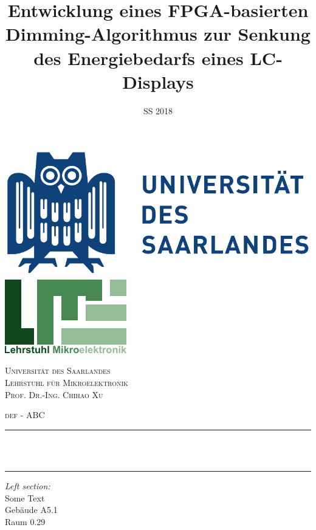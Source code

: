 
\title{Entwicklung eines FPGA-basierten Dimming-Algorithmus zur Senkung des Energiebedarfs eines LC-Displays}
\date{SS 2018}	

\begin{titlepage}	
	\centering
    \vspace*{-2.0 cm}
    \includegraphics[scale = 0.5]{inc/img/title/uds.pdf}\hspace{10em}
	\includegraphics[scale = 1.25]{inc/img/title/lme.pdf}    
    \vfill
    \begin{singlespace}
    \textsc{\LARGE Universität des Saarlandes} \\ [0.5 cm]
    \textsc{\LARGE Lehrstuhl für Mikroelektronik} \\ [0.5 cm]
    \textsc{\LARGE Prof. Dr.-Ing. Chihao Xu} \\ [1 cm]
    \end{singlespace}
    \vfill
   	\textsc{\huge  def - ABC}
   	\vfill
	\rule{\linewidth}{0.2 mm} \\[0.3 cm]	
	\doublespacing{ \huge \textbf \thetitle }	\\
	\rule{\linewidth}{0.2 mm} 
	\vfill
	
\begin{onehalfspace}
	\begin{minipage}[t]{0.43\textwidth}
		\begin{flushleft}
			\emph{\large Left section:}\\[0.3em]
			Some Text \\
			Gebäude A5.1\\
			Raum 0.29\\
		\end{flushleft}
	\end{minipage}~			
	\begin{minipage}[t]{0.43\textwidth}
			

\end{minipage}
\end{onehalfspace}
\end{titlepage}
